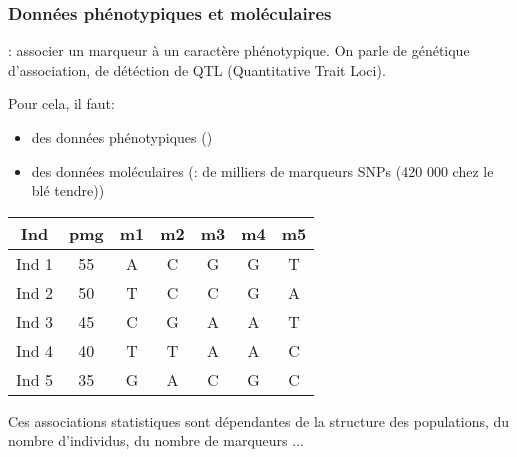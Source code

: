 \begin{frame}
\frametitle{Données phénotypiques et moléculaires}

: associer un marqueur à un caractère phénotypique. 
On parle de génétique d'association, de détéction de QTL (Quantitative Trait Loci). 

Pour cela, il faut:
\begin{itemize}
\item des données phénotypiques ()
\item des données moléculaires (:  de milliers de marqueurs SNPs (420 000 chez le blé tendre))
\end{itemize}

\vspace{.5cm}

\begin{overprint}
\begin{center}
\begin{tabular}{ccccccc}
\hline
Ind & pmg & m1 & m2 & m3 & m4 & m5\\
\hline
Ind 1 & 55 & \cellcolor{mln-green} A & C & \cellcolor{mln-green} G & G & T \\
Ind 2 & 50 & T & C & C & G & A \\
Ind 3 & 45 & C & G & A & A & T \\
Ind 4 & 40 & T & T & A & A & C \\
Ind 5 & 35 & G & A & C & G & C \\
\hline
\end{tabular}
\end{center}

Ces associations statistiques sont dépendantes de la structure des populations, du nombre d'individus, du nombre de marqueurs ...
\end{overprint}

\end{frame}


